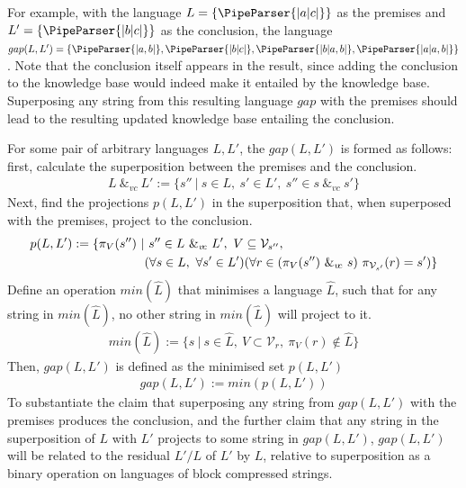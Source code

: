 \documentclass[a4paper,12pt,leqno]{article}
\newcommand{\vph}[1]{\vphantom{#1}}
\newcommand{\ebox}[1]{\fbox{$\vph{'(),}#1$}}
\newcommand{\spvc}{~\&_{v\!c}~}
\newcommand{\V}{\mathcal{V}}
\newcommand{\EventString}[1]{%
	\renewcommand*{\do}[1]{\ebox{##1}}%
	\PipeParser{#1}%
}
\begin{document}
For example, with the language $L = \{\EventString{{}|a|c|{}}\}$ as the premises and $L' = \{\EventString{{}|b|c|{}}\}$ as the conclusion, the language $gap(L, L') = \{\EventString{{}|a,b|{}}, \EventString{{}|b|c|{}}, \EventString{{}|b|a,b|{}}, \EventString{{}|a|a,b|{}}\}$. Note that the conclusion itself appears in the result, since adding the conclusion to the knowledge base would indeed make it entailed by the knowledge base. Superposing any string from this resulting language $gap$ with the premises should lead to the resulting updated knowledge base entailing the conclusion.

For some pair of arbitrary languages $L, L'$, the $gap(L,L')$ is formed as follows: first, calculate the superposition between the premises and the conclusion.
\begin{align}
	L \spvc L' := \{ s'' ~|~ s \in L,~ s' \in L',~ s'' \in s \spvc s'\}
\end{align}
Next, find the projections $p(L, L')$ in the superposition that, when superposed with the premises, project to the conclusion.
\begin{align}
	p(L, L') := \{\pi_V(s'') ~|&~ s'' \in L \spvc L',~ V \subseteq \V_{s''},\\
	&(\forall s \in L,~\forall s' \in L')(\forall r \in (\pi_V(s'') \spvc s)~ \pi_{\V_{s'}}(r) = s') \}\notag
\end{align}
Define an operation $min(\hat{L})$ that minimises a language $\hat{L}$, such that for any string in $min(\hat{L})$, no other string in $min(\hat{L})$ will project to it.
\begin{align}
	min(\hat{L}) := \{s ~|~ s \in \hat{L}, ~V \subset \V_r, ~\pi_V(r) \notin \hat{L} \}
\end{align}
Then, $gap(L, L')$ is defined as the minimised set $p(L,L')$
\begin{align}
	gap(L, L') := min(p(L, L'))\label{def:gap}
\end{align}
To substantiate the claim that superposing any string from $gap(L,L')$ with the premises produces the conclusion, and the further claim that any string in the superposition of $L$ with $L'$ projects to some string in $gap(L, L')$, $gap(L, L')$ will be related to the residual $L'/L$ of $L'$ by $L$, relative to superposition as a binary operation on languages of block compressed strings.
\end{document}
